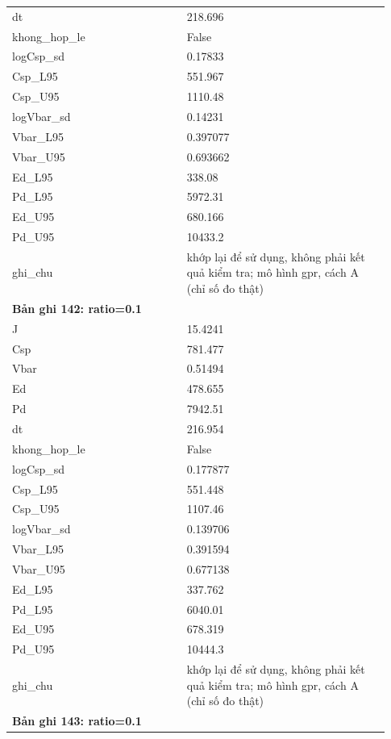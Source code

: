 \begin{longtable}{p{0.43\linewidth}p{0.50\linewidth}}
dt & 218.696 \\
khong\_\allowbreak hop\_\allowbreak le & False \\
logCsp\_\allowbreak sd & 0.17833 \\
Csp\_\allowbreak L95 & 551.967 \\
Csp\_\allowbreak U95 & 1110.48 \\
logVbar\_\allowbreak sd & 0.14231 \\
Vbar\_\allowbreak L95 & 0.397077 \\
Vbar\_\allowbreak U95 & 0.693662 \\
Ed\_\allowbreak L95 & 338.08 \\
Pd\_\allowbreak L95 & 5972.31 \\
Ed\_\allowbreak U95 & 680.166 \\
Pd\_\allowbreak U95 & 10433.2 \\
ghi\_\allowbreak chu & khớp lại để sử dụng, không phải kết quả kiểm tra; mô hình gpr, cách A (chỉ số đo thật) \\
\midrule
\multicolumn{2}{p{0.95\linewidth}}{\textbf{Bản ghi 142: ratio=0.1}} \\
J & 15.4241 \\
Csp & 781.477 \\
Vbar & 0.51494 \\
Ed & 478.655 \\
Pd & 7942.51 \\
dt & 216.954 \\
khong\_\allowbreak hop\_\allowbreak le & False \\
logCsp\_\allowbreak sd & 0.177877 \\
Csp\_\allowbreak L95 & 551.448 \\
Csp\_\allowbreak U95 & 1107.46 \\
logVbar\_\allowbreak sd & 0.139706 \\
Vbar\_\allowbreak L95 & 0.391594 \\
Vbar\_\allowbreak U95 & 0.677138 \\
Ed\_\allowbreak L95 & 337.762 \\
Pd\_\allowbreak L95 & 6040.01 \\
Ed\_\allowbreak U95 & 678.319 \\
Pd\_\allowbreak U95 & 10444.3 \\
ghi\_\allowbreak chu & khớp lại để sử dụng, không phải kết quả kiểm tra; mô hình gpr, cách A (chỉ số đo thật) \\
\midrule
\multicolumn{2}{p{0.95\linewidth}}{\textbf{Bản ghi 143: ratio=0.1}} \\

\end{longtable}
